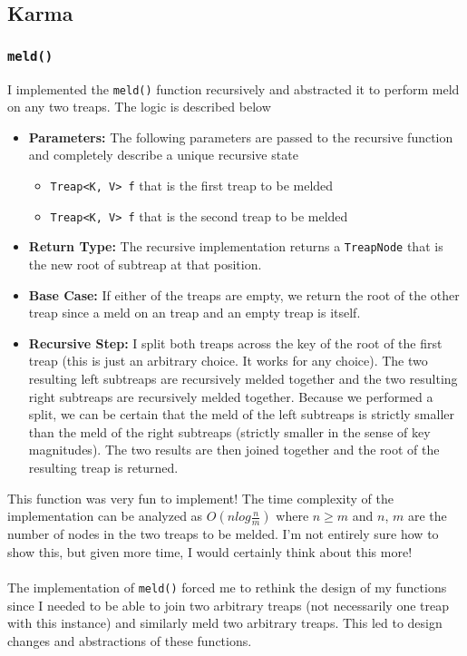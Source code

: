 \documentclass[11pt]{article}
\def\tt{\texttt}
\def\meld{\tt{meld()}}
\def\tn{\tt{TreapNode}}
\begin{document}
\subsection{Karma}
\subsubsection{\meld}
I implemented the \meld{} function recursively and abstracted it to perform meld on any two treaps. The logic is described below
\begin{itemize}
	\item \textbf{Parameters: } The following parameters are passed to the recursive function and completely describe a unique recursive state
	\begin{itemize}
		\item \tt{Treap<K, V> f} that is the first treap to be melded
		\item \tt{Treap<K, V> f} that is the second treap to be melded
	\end{itemize}
	\item \textbf{Return Type: } The recursive implementation returns a \tn{} that is the new root of subtreap at that position.
	\item \textbf{Base Case: } If either of the treaps are empty, we return the root of the other treap since a meld on an treap and an empty treap is itself.
	\item \textbf{Recursive Step: } I split both treaps across the key of the root of the first treap (this is just an arbitrary choice. It works for any choice). The two resulting left subtreaps are recursively melded together and the two resulting right subtreaps are recursively melded together. Because we performed a split, we can be certain that the meld of the left subtreaps is strictly smaller than the meld of the right subtreaps (strictly smaller in the sense of key magnitudes). The two results are then joined together and the root of the resulting treap is returned. 
\end{itemize}
This function was very fun to implement! The time complexity of the implementation can be analyzed as $O(n log\frac{n}{m})$ where $n\geq m$ and $n$, $m$ are the number of nodes in the two treaps to be melded. I'm not entirely sure how to show this, but given more time, I would certainly think about this more! \\ \\
The implementation of \meld{} forced me to rethink the design of my functions since I needed to be able to join two arbitrary treaps (not necessarily one treap with this instance) and similarly meld two arbitrary treaps. This led to design changes and abstractions of these functions.
\end{document}
